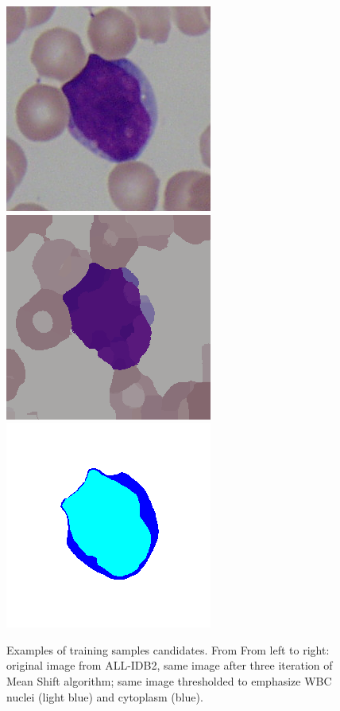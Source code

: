 \documentclass[final,a4paper,12pt,english]{UnicaPhdThesis3}
\begin{document}
{\begin{figure}[!b]
	\centering
	\includegraphics[height=0.10\textheight]{images/2015_2_iciap/Im002_1}
	\includegraphics[height=0.10\textheight]{images/2015_2_iciap/Im002_1_MS}
	\includegraphics[height=0.10\textheight]{images/2015_2_iciap/Im002_1_T}
	\caption{\label{fig:svm_candidates} Examples of training samples candidates. From From left to right: original image from ALL-IDB2, same image after three iteration of Mean Shift algorithm; same image thresholded to emphasize WBC nuclei (light blue) and cytoplasm (blue).}
\end{figure}

}
\end{document}
